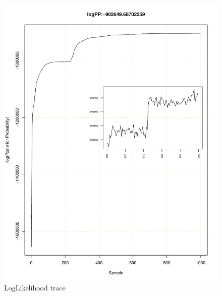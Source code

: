 \documentclass[11pt]{labbook}
\begin{document}
    \begin{figure}
        \centering
        \includegraphics[scale=.65]{FONSE_Plots/2016/July_27/LogLikeTrace}
        \caption{LogLikelihood trace}
        \label{fig:JULY27_LIKE}
    \end{figure}
\end{document}
